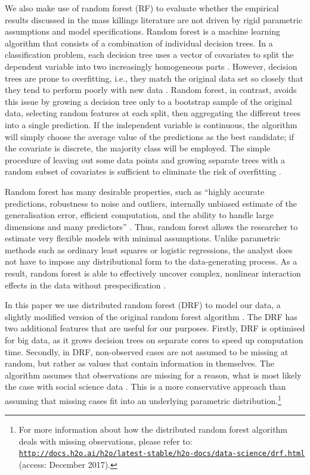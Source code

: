 \documentclass[a4paper,12pt]{article}
\begin{document}
We also make use of random forest (RF) \citep{breiman2001random} to evaluate whether the empirical results discussed in the mass killings literature are not driven by rigid parametric assumptions and model specifications. Random forest is a machine learning algorithm that consists of a combination of individual decision trees. In a classification problem, each decision tree uses a vector of covariates to split the dependent variable into two increasingly homogeneous parts \citep{breiman2001statistical}. However, decision trees are prone to overfitting, i.e., they match the original data set so closely that they tend to perform poorly with new data \citep{dietterich1995comparison,ho1998random}. Random forest, in contrast, avoids this issue by growing a decision tree only to a bootstrap sample of the original data, selecting random features at each split, then aggregating the different trees into a single prediction. If the independent variable is continuous, the algorithm will simply choose the average value of the predictions as the best candidate; if the covariate is discrete, the majority class will be employed. The simple procedure of leaving out some data points and growing separate trees with a random subset of covariates is sufficient to eliminate the risk of overfitting \citep[9-10]{jones2015exploratory}.
	
Random forest has many desirable properties, such as ``highly accurate predictions, robustness to noise and outliers, internally unbiased estimate of the generalisation error, efficient computation, and the ability to handle large dimensions and many predictors'' \citep[7]{muchlinski2015comparing}. Thus, random forest allows the researcher to estimate very flexible models with minimal assumptions. Unlike parametric methods such as ordinary least squares or logistic regressions, the analyst does not have to impose any distributional form to the data-generating process. As a result, random forest is able to effectively uncover complex, nonlinear interaction effects in the data without prespecification \citep{jones2015exploratory,jones2018there}.
	
In this paper we use distributed random forest (DRF) to model our data, a slightly modified version of the original random forest algorithm \citep{h2o2017}. The DRF has two additional features that are useful for our purposes. Firstly, DRF is optimised for big data, as it grows decision trees on separate cores to speed up computation time. Secondly, in DRF, non-observed cases are not assumed to be missing at random, but rather as values that contain information in themselves. The algorithm assumes that observations are missing for a reason, what is most likely the case with social science data \citep{lall2016multiple}. This is a more conservative approach than assuming that missing cases fit into an underlying parametric distribution.\footnote{For more information about how the distributed random forest algorithm deals with missing observations, please refer to: \href{http://docs.h2o.ai/h2o/latest-stable/h2o-docs/data-science/drf.html}{\texttt{http://docs.h2o.ai/h2o/latest-stable/h2o-docs/data-science/drf.html}} (access: December 2017).}
	
\end{document}
